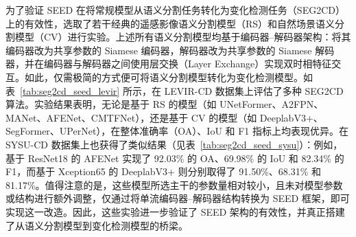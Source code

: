 为了验证 SEED 在将常规模型从语义分割任务转化为变化检测任务（SEG2CD）上的有效性，选取了若干经典的遥感影像语义分割模型（RS）和自然场景语义分割模型（CV）进行实验。上述所有语义分割模型均基于编码器–解码器架构：将其编码器改为共享参数的 Siamese 编码器，解码器改为共享参数的 Siamese 解码器，并在编码器与解码器之间使用层交换（Layer Exchange）实现双时相特征交互。如此，仅需极简的方式便可将语义分割模型转化为变化检测模型。如表~\ref{tab:seg2cd_seed_levir} 所示，在 LEVIR-CD 数据集上评估了多种 SEG2CD 算法。实验结果表明，无论是基于 RS 的模型（如 UNetFormer、A2FPN、MANet、AFENet、CMTFNet），还是基于 CV 的模型（如 DeeplabV3+、SegFormer、UPerNet），在整体准确率（OA）、IoU 和 F1 指标上均表现优异。在 SYSU-CD 数据集上也获得了类似结果（见表~\ref{tab:seg2cd_seed_sysu}）：例如，基于 ResNet18 的 AFENet 实现了 92.03\% 的 OA、69.98\% 的 IoU 和 82.34\% 的 F1，而基于 Xception65 的 DeeplabV3+ 则分别取得了 91.50\%、68.31\% 和 81.17\%。值得注意的是，这些模型所选主干的参数量相对较小，且未对模型参数或结构进行额外调整，仅通过将单流编码器–解码器结构转换为 SEED 框架，即可实现这一改造。因此，这些实验进一步验证了 SEED 架构的有效性，并真正搭建了从语义分割模型到变化检测模型的桥梁。  

